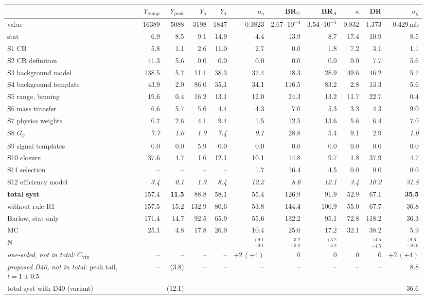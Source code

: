 \begin{tabular}{lrrrrrrrrrr}
\toprule
 & $Y_\mathrm{bump}$ & $Y_\mathrm{peak}$ & $Y_5$ & $Y_4$ & $a_\eta$ & BR$_G$ & BR$_A$ & $\kappa$ & DR & $\sigma_\eta$ \\
\midrule
value & 16389 & 5088 & 3198 & 1847 & 0.3823 & $2.67\cdot10^{-4}$ & $3.54\cdot10^{-4}$ & 0.832 & 1.373 & 0.429\,mb \\
stat & 6.9 & 8.5 & 9.1 & 14.9 & 4.4 & 13.9 & 8.7 & 17.4 & 10.9 & 8.5 \\
\midrule
S1 CB & 5.8 & 1.1 & 2.6 & 11.0 & 2.7 & 0.0 & 1.8 & 7.2 & 3.1 & 1.1 \\
S2 CR definition & 41.3 & 5.6 & 0.0 & 0.0 & 0.0 & 0.0 & 0.0 & 0.0 & 7.7 & 5.6 \\
S3 background model & 138.5 & 5.7 & 11.1 & 38.3 & 37.4 & 18.3 & 28.9 & 49.6 & 46.2 & 5.7 \\
S4 background template & 43.9 & 2.0 & 86.0 & 35.1 & 34.1 & 116.5 & 83.2 & 2.8 & 13.3 & 5.6 \\
S5 range, binning & 19.6 & 0.4 & 16.2 & 13.1 & 12.0 & 24.3 & 13.2 & 11.7 & 22.7 & 0.4 \\
S6 mass transfer & 6.6 & 5.7 & 5.6 & 4.4 & 4.3 & 7.0 & 5.3 & 3.3 & 4.3 & 9.0 \\
S7 physics weights & 0.7 & 2.6 & 4.1 & 9.4 & 1.5 & 12.5 & 13.6 & 5.6 & 6.4 & 7.0 \\
S8 $G_\eta$ & \textit{7.7} & \textit{1.0} & \textit{1.0} & \textit{7.4} & \textit{9.1} & 28.8 & 5.4 & 9.1 & 2.9 & \textit{1.0} \\
S9 signal templates & 0.0 & 0.0 & 5.9 & 0.0 & 0.0 & 0.0 & 0.0 & 0.0 & 0.0 & 0.0 \\
S10 closure & 37.6 & 4.7 & 1.6 & 12.1 & 10.1 & 14.8 & 9.7 & 1.8 & 37.9 & 4.7 \\
S11 selection & -- & -- & -- & -- & 1.7 & 16.4 & 4.5 & 0.0 & 0.0 & 0.0 \\
S12 efficiency model & \textit{3.4} & \textit{0.1} & \textit{1.3} & \textit{8.4} & \textit{12.2} & \textit{8.6} & \textit{12.1} & \textit{3.4} & \textit{10.2} & \textit{31.8} \\
\midrule
\textbf{total syst} & 157.4 & \textbf{11.5} & 88.8 & 58.1 & 55.4 & 126.9 & 91.9 & 52.9 & 67.1 & \textbf{35.5} \\
\quad without rule R1 & 157.5 & 15.2 & 132.9 & 80.6 & 53.8 & 144.4 & 100.9 & 55.0 & 67.7 & 36.8 \\
\quad Barlow, stat only & 171.4 & 14.7 & 92.5 & 65.9 & 55.6 & 132.2 & 95.1 & 72.8 & 118.2 & 36.3 \\
MC & 25.1 & 4.8 & 17.8 & 26.9 & 10.4 & 25.0 & 17.2 & 32.1 & 38.2 & 5.9 \\
N & -- & -- & -- & -- & $^{+9.1}_{-9.1}$ & $^{+3.2}_{-3.2}$ & $^{+3.2}_{-3.2}$ & -- & $^{+4.5}_{-4.5}$ & $^{+9.6}_{-10.0}$ \\
\midrule
\textit{one-sided, not in total:} $C_{\mathrm{vtx}}$ & -- & -- & -- & -- & $+2\,(+4)$ & 0 & 0 & 0 & 0 & $+2\,(+4)$ \\
\textit{proposed D40, not in total:} peak tail, $t=1\pm0.5$ & -- & (3.8) & -- & -- & -- & -- & -- & -- & -- & 8.8 \\
\quad total syst with D40 (variant) & -- & (12.1) & -- & -- & -- & -- & -- & -- & -- & 36.6 \\
\bottomrule
\end{tabular}
